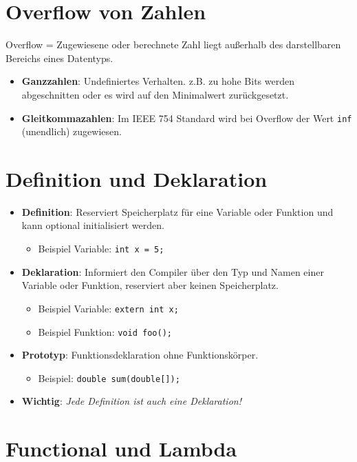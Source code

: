 \documentclass[8pt, landscape]{article}
\newcommand{\algo}[1]{\textbf{\textcolor{blue!60!black}{#1}}}
\newcommand{\datastruct}[1]{\textbf{\textcolor{red!60!black}{#1}}}
\begin{document}
\begin{multicols*}{4}
\section{Overflow von Zahlen}
Overflow = Zugewiesene oder berechnete Zahl liegt außerhalb des darstellbaren Bereichs eines Datentyps.
\begin{itemize}
    \item \datastruct{Ganzzahlen}: Undefiniertes Verhalten. z.B. zu hohe Bits werden abgeschnitten oder es wird auf den Minimalwert zurückgesetzt.
    \item \datastruct{Gleitkommazahlen}: Im IEEE 754 Standard wird bei Overflow der Wert \texttt{inf} (unendlich) zugewiesen.
\end{itemize}

\section{Definition und Deklaration}
\begin{itemize}
    \item \algo{Definition}: Reserviert Speicherplatz für eine Variable oder Funktion und kann optional initialisiert werden.
    \begin{itemize}
        \item Beispiel Variable: \lstinline|int x = 5;|
    \end{itemize}
    \item \datastruct{Deklaration}: Informiert den Compiler über den Typ und Namen einer Variable oder Funktion, reserviert aber keinen Speicherplatz.
    \begin{itemize}
        \item Beispiel Variable: \lstinline|extern int x;|
        \item Beispiel Funktion: \lstinline|void foo();|
    \end{itemize}
    \item \datastruct{Prototyp}: Funktionsdeklaration ohne Funktionskörper.
    \begin{itemize}
        \item Beispiel: \lstinline|double sum(double[]);|
    \end{itemize}
    \item \algo{Wichtig}: \textit{Jede Definition ist auch eine Deklaration!}
\end{itemize}

\section{Functional und Lambda}


\end{multicols*}
\end{document}
